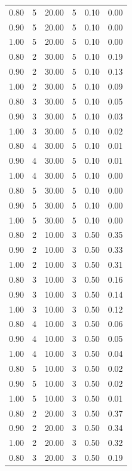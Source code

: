 \documentclass[12pt]{article}
\begin{document}
{{{{\begin{longtable}{cccccc}
  0.80 &   5 & 20.00 &   5 & 0.10 & 0.00 \\ 
  0.90 &   5 & 20.00 &   5 & 0.10 & 0.00 \\ 
  1.00 &   5 & 20.00 &   5 & 0.10 & 0.00 \\ 
  0.80 &   2 & 30.00 &   5 & 0.10 & 0.19 \\ 
  0.90 &   2 & 30.00 &   5 & 0.10 & 0.13 \\ 
  1.00 &   2 & 30.00 &   5 & 0.10 & 0.09 \\ 
  0.80 &   3 & 30.00 &   5 & 0.10 & 0.05 \\ 
  0.90 &   3 & 30.00 &   5 & 0.10 & 0.03 \\ 
  1.00 &   3 & 30.00 &   5 & 0.10 & 0.02 \\ 
  0.80 &   4 & 30.00 &   5 & 0.10 & 0.01 \\ 
  0.90 &   4 & 30.00 &   5 & 0.10 & 0.01 \\ 
  1.00 &   4 & 30.00 &   5 & 0.10 & 0.00 \\ 
  0.80 &   5 & 30.00 &   5 & 0.10 & 0.00 \\ 
  0.90 &   5 & 30.00 &   5 & 0.10 & 0.00 \\ 
  1.00 &   5 & 30.00 &   5 & 0.10 & 0.00 \\ 
  0.80 &   2 & 10.00 &   3 & 0.50 & 0.35 \\ 
  0.90 &   2 & 10.00 &   3 & 0.50 & 0.33 \\ 
  1.00 &   2 & 10.00 &   3 & 0.50 & 0.31 \\ 
  0.80 &   3 & 10.00 &   3 & 0.50 & 0.16 \\ 
  0.90 &   3 & 10.00 &   3 & 0.50 & 0.14 \\ 
  1.00 &   3 & 10.00 &   3 & 0.50 & 0.12 \\ 
  0.80 &   4 & 10.00 &   3 & 0.50 & 0.06 \\ 
  0.90 &   4 & 10.00 &   3 & 0.50 & 0.05 \\ 
  1.00 &   4 & 10.00 &   3 & 0.50 & 0.04 \\ 
  0.80 &   5 & 10.00 &   3 & 0.50 & 0.02 \\ 
  0.90 &   5 & 10.00 &   3 & 0.50 & 0.02 \\ 
  1.00 &   5 & 10.00 &   3 & 0.50 & 0.01 \\ 
  0.80 &   2 & 20.00 &   3 & 0.50 & 0.37 \\ 
  0.90 &   2 & 20.00 &   3 & 0.50 & 0.34 \\ 
  1.00 &   2 & 20.00 &   3 & 0.50 & 0.32 \\ 
  0.80 &   3 & 20.00 &   3 & 0.50 & 0.19 \\ 

\end{longtable}}}}}
\end{document}
